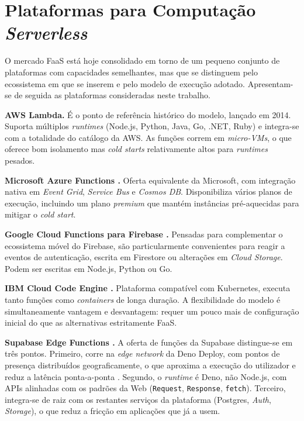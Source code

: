 \documentclass[conference]{IEEEtran}
\begin{document}
\section{Plataformas para Computação \textit{Serverless}}
O mercado FaaS está hoje consolidado em torno de um pequeno conjunto de plataformas com capacidades semelhantes, mas que se distinguem pelo ecossistema em que se inserem e pelo modelo de execução adotado. Apresentam-se de seguida as plataformas consideradas neste trabalho.

\textbf{AWS Lambda.} É o ponto de referência histórico do modelo, lançado em 2014. Suporta múltiplos \textit{runtimes} (Node.js, Python, Java, Go, .NET, Ruby) e integra-se com a totalidade do catálogo da AWS. As funções correm em \textit{micro-VMs}, o que oferece bom isolamento mas \textit{cold starts} relativamente altos para \textit{runtimes} pesados.

\textbf{Microsoft Azure Functions \cite{azurefunctions}.} Oferta equivalente da Microsoft, com integração nativa em \textit{Event Grid}, \textit{Service Bus} e \textit{Cosmos DB}. Disponibiliza vários planos de execução, incluindo um plano \textit{premium} que mantém instâncias pré-aquecidas para mitigar o \textit{cold start}.

\textbf{Google Cloud Functions para Firebase \cite{firebasefunctions}.} Pensadas para complementar o ecossistema móvel do Firebase, são particularmente convenientes para reagir a eventos de autenticação, escrita em Firestore ou alterações em \textit{Cloud Storage}. Podem ser escritas em Node.js, Python ou Go.

\textbf{IBM Cloud Code Engine \cite{ibmcodeengine}.} Plataforma compatível com Kubernetes, executa tanto funções como \textit{containers} de longa duração. A flexibilidade do modelo é simultaneamente vantagem e desvantagem: requer um pouco mais de configuração inicial do que as alternativas estritamente FaaS.

\textbf{Supabase Edge Functions \cite{supabase}.} A oferta de funções da Supabase distingue-se em três pontos. Primeiro, corre na \textit{edge network} da Deno Deploy, com pontos de presença distribuídos geograficamente, o que aproxima a execução do utilizador e reduz a latência ponta-a-ponta \cite{satya2017,shi2016}. Segundo, o \textit{runtime} é Deno, não Node.js, com APIs alinhadas com os padrões da Web (\texttt{Request}, \texttt{Response}, \texttt{fetch}). Terceiro, integra-se de raiz com os restantes serviços da plataforma (Postgres, \textit{Auth}, \textit{Storage}), o que reduz a fricção em aplicações que já a usem.
\end{document}
